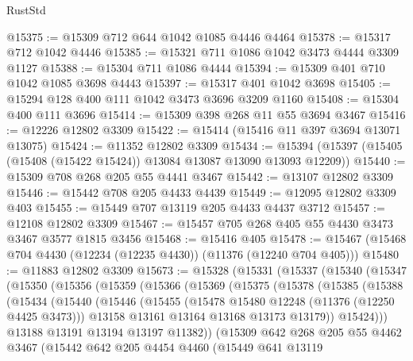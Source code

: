 \begin{lexlean}{RustStd}
\begin{coremodule}
{\begin{coremodule}
{{{{{{{{{{{{{{{{{{{{{{{{{{{{{{{{{{{{{{{{{{{{{{{{{{{{{{{{{{{{{{{{{{{{{{{{{{{{{{{{{{{{{@15375 := @15309 @712 @644 @1042 @1085 @4446 @4464
@15378 := @15317 @712 @1042 @4446
@15385 := @15321 @711 @1086 @1042 @3473 @4444 @3309 @1127
@15388 := @15304 @711 @1086 @4444
@15394 := @15309 @401 @710 @1042 @1085 @3698 @4443
@15397 := @15317 @401 @1042 @3698
@15405 := @15294 @128 @400 @111 @1042 @3473 @3696 @3209 @1160
@15408 := @15304 @400 @111 @3696
@15414 := @15309 @398 @268 @11 @55 @3694 @3467
@15416 := @12226 @12802 @3309
@15422 := @15414 (@15416 @11 @397 @3694 @13071 @13075)
@15424 := @11352 @12802 @3309
@15434 := @15394 (@15397 (@15405 (@15408 (@15422 @15424)) @13084 @13087 @13090 @13093 @12209))
@15440 := @15309 @708 @268 @205 @55 @4441 @3467
@15442 := @13107 @12802 @3309
@15446 := @15442 @708 @205 @4433 @4439
@15449 := @12095 @12802 @3309 @403
@15455 := @15449 @707 @13119 @205 @4433 @4437 @3712
@15457 := @12108 @12802 @3309
@15467 := @15457 @705 @268 @405 @55 @4430 @3473 @3467 @3577 @1815 @3456
@15468 := @15416 @405
@15478 := @15467 (@15468 @704 @4430 (@12234 (@12235 @4430)) (@11376 (@12240 @704 @405)))
@15480 := @11883 @12802 @3309
@15673 := @15328
    (@15331
      (@15337
        (@15340
          (@15347
            (@15350
              (@15356
                (@15359
                  (@15366
                    (@15369
                      (@15375
                        (@15378
                          (@15385
                            (@15388
                              (@15434
                                (@15440
                                  (@15446
                                    (@15455
                                      (@15478 @15480 @12248 (@11376 (@12250 @4425 @3473)))
                                      @13158
                                      @13161
                                      @13164
                                      @13168
                                      @13173
                                      @13179))
                                  @15424)))
                            @13188
                            @13191
                            @13194
                            @13197
                            @11382))
                        (@15309
                          @642
                          @268
                          @205
                          @55
                          @4462
                          @3467
                          (@15442
                            @642
                            @205
                            @4454
                            @4460
                            (@15449
                              @641
                              @13119
}}}}}}}}}}}}}}}}}}}}}}}}}}}}}}}}}}}}}}}}}}}}}}}}}}}}}}}}}}}}}}}}}}}}}}}}}}}}}}}}}}}}}
\end{coremodule}}
\end{coremodule}
\end{lexlean}
